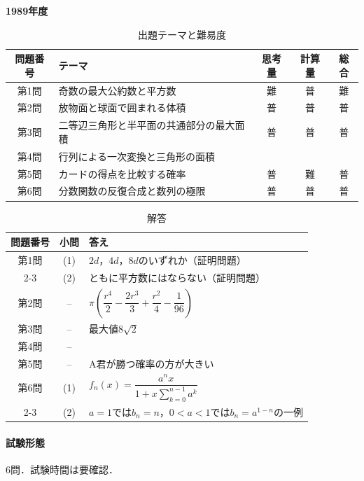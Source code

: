 \documentclass[../../main.tex]{subfiles}
\begin{document}
\begin{center}
  {\fontsize{48pt}{58pt}\selectfont \textbf{1989}\normalsize\textbf{年度}}
\end{center}

\begin{table}[htb]
  \centering
  \caption{出題テーマと難易度}
  \begin{tabular}{|c|p{6.2cm}|c|c|c|}
    \hline
    \textbf{問題番号} & \textbf{テーマ} & \textbf{思考量} & \textbf{計算量} & \textbf{総合} \\
    \hline
    第1問 & 奇数の最大公約数と平方数 & 難 & 普 & 難 \\
    \hline
    第2問 & 放物面と球面で囲まれる体積 & 普 & 普 & 普 \\
    \hline
    第3問 & 二等辺三角形と半平面の共通部分の最大面積 & 普 & 普 & 普 \\
    \hline
    第4問 & 行列による一次変換と三角形の面積 &  &  &  \\
    \hline
    第5問 & カードの得点を比較する確率 & 普 & 難 & 普 \\
    \hline
    第6問 & 分数関数の反復合成と数列の極限 & 普 & 普 & 普 \\
    \hline
  \end{tabular}
\end{table}

\begin{table}[htb]
  \centering
  \caption{解答}
  \renewcommand{\arraystretch}{1.4}
  \begin{tabular}{|c|c|p{9cm}|}
    \hline
    \textbf{問題番号} & \textbf{小問} & \textbf{答え} \\
    \hline
    第1問 & (1) & $2d$，$4d$，$8d$のいずれか（証明問題） \\
    \cline{2-3}
    & (2) & ともに平方数にはならない（証明問題） \\
    \hline
    第2問 & -- & $\pi\left(\dfrac{r^4}{2}-\dfrac{2r^3}{3}+\dfrac{r^2}{4}-\dfrac{1}{96}\right)$ \\
    \hline
    第3問 & -- & 最大値$8\sqrt{2}$ \\
    \hline
    第4問 & -- &  \\
    \hline
    第5問 & -- & A君が勝つ確率の方が大きい \\
    \hline
    第6問 & (1) & $f_n(x)=\dfrac{a^n x}{1+x\sum_{k=0}^{n-1}a^k}$ \\
    \cline{2-3}
    & (2) & $a=1$では$b_n=n$，$0<a<1$では$b_n=a^{1-n}$の一例 \\
    \hline
  \end{tabular}
\end{table}

\paragraph{試験形態}
6問．試験時間は要確認．
\end{document}
